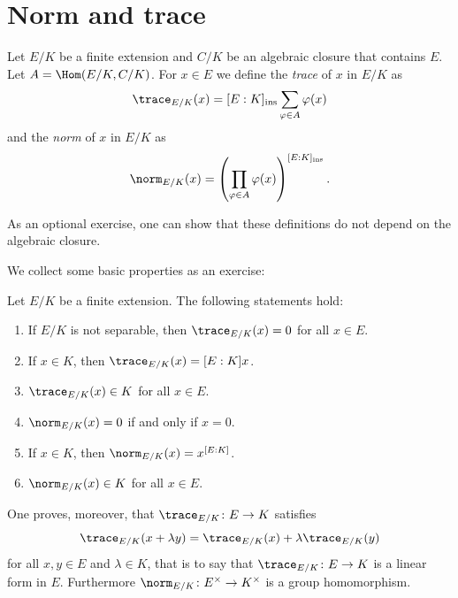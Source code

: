 
\section{Norm and trace}

\begin{definition}
    Let $E/K$ be a finite extension and $C/K$ be an algebraic closure 
    that contains $E$. Let $A=\Hom(E/K,C/K)$. For $x\in E$
    we define the \emph{trace} of $x$ in $E/K$ 
    as 
    \[
    \trace_{E/K}(x)=[E:K]_{\operatorname{ins}}\sum_{\varphi\in A}\varphi(x)
    \]
    and the \emph{norm} of $x$ in $E/K$ as
    \[
    \norm_{E/K}(x)=\left(\prod_{\varphi\in A}\varphi(x)\right)^{[E:K]_{\operatorname{ins}}}.
    \]
\end{definition}

As an optional exercise, one can show that these definitions do not depend on the algebraic closure. 

We collect some basic properties as an exercise:

\begin{exercise}
\label{xca:norm_and_trace}
    Let $E/K$ be a finite extension. The following statements hold:
    \begin{enumerate}
        \item If $E/K$ is not separable, then $\trace_{E/K}(x)=0$ for all $x\in E$.
        \item If $x\in K$, then $\trace_{E/K}(x)=[E:K]x$.
        \item $\trace_{E/K}(x)\in K$ for all $x\in E$.
        \item $\norm_{E/K}(x)=0$ if and only if $x=0$. 
        \item If $x\in K$, then $\norm_{E/K}(x)=x^{[E:K]}$. 
        \item $\norm_{E/K}(x)\in K$ for all $x\in E$. 
    \end{enumerate}
\end{exercise}

One proves, moreover, that  
$\trace_{E/K}\colon E\to K$ 
satisfies
\[
\trace_{E/K}(x+\lambda y)=
\trace_{E/K}(x)+\lambda\trace_{E/K}(y)
\]
for all $x,y\in E$ and $\lambda\in K$, that is to say that 
$\trace_{E/K}\colon E\to K$ 
is a 
linear form in $E$. Furthermore 
$\norm_{E/K}\colon E^{\times}\to K^{\times}$ 
is a group homomorphism. 

